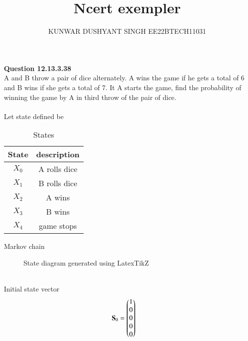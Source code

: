 \documentclass[book,11pt]{IEEEtran}
\begin{document}


\let\vec\mathbf

\vspace{3cm}

\title{
Ncert exempler
}
\author{ KUNWAR DUSHYANT SINGH EE22BTECH11031}


\maketitle

\newpage

\maketitle
\textbf{Question 12.13.3.38}\\
A and B throw a pair of dice alternately. A wins the game if he gets a total of
6 and B wins if she gets a total of 7. It A starts the game, find the probability of
winning the game by A in third throw of the pair of dice.\\
\fi
\solution \\
Let state defined be
\begin{table}[H]
\begin{tabular}{|c|c|}
\hline
State &description \\ \hline
 $X_0$ & A rolls dice\\ \hline
 $X_1$ & B rolls dice\\\hline
 $X_2$ & A wins\\\hline
 $X_3$ & B wins\\\hline
 $X_4$  & game stops\\\hline
\end{tabular}
\caption{States}
\label{tab:exemplar/12/13/3/38}
\end{table}
Markov chain\\
\begin{figure}[ht!]
    \centering
    \resizebox{\linewidth}{!}{}
    \caption{State diagram generated using LatexTikZ}
    \label{fig:State_diagram_die_coin}
\end{figure}
\\
Initial state vector\\
\begin{align}
\vec{S}_0 &= \myvec{ 1\\ 0\\ 0\\0\\0\\}
\end{align}
\end{document}
